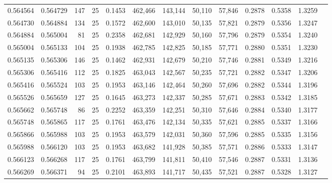 \begin{tabular}{rrrrrrrrrrrrr}
0.564564 & 0.564729 &   147 &  25 &                                     0.1453 & 462,466 & 143,144 &  50,110 &  57,846 & 0.2878 & 0.5358 & 1.3259 \\
0.564730 & 0.564884 &   134 &  25 &                                     0.1572 & 462,600 & 143,010 &  50,135 &  57,821 & 0.2879 & 0.5356 & 1.3247 \\
0.564884 & 0.565004 &    81 &  25 &                                     0.2358 & 462,681 & 142,929 &  50,160 &  57,796 & 0.2879 & 0.5354 & 1.3240 \\
0.565004 & 0.565133 &   104 &  25 &                                     0.1938 & 462,785 & 142,825 &  50,185 &  57,771 & 0.2880 & 0.5351 & 1.3230 \\
0.565135 & 0.565306 &   146 &  25 &                                     0.1462 & 462,931 & 142,679 &  50,210 &  57,746 & 0.2881 & 0.5349 & 1.3216 \\
0.565306 & 0.565416 &   112 &  25 &                                     0.1825 & 463,043 & 142,567 &  50,235 &  57,721 & 0.2882 & 0.5347 & 1.3206 \\
0.565416 & 0.565524 &   103 &  25 &                                     0.1953 & 463,146 & 142,464 &  50,260 &  57,696 & 0.2882 & 0.5344 & 1.3196 \\
0.565526 & 0.565659 &   127 &  25 &                                     0.1645 & 463,273 & 142,337 &  50,285 &  57,671 & 0.2883 & 0.5342 & 1.3185 \\
0.565662 & 0.565748 &    86 &  25 &                                     0.2252 & 463,359 & 142,251 &  50,310 &  57,646 & 0.2884 & 0.5340 & 1.3177 \\
0.565748 & 0.565865 &   117 &  25 &                                     0.1761 & 463,476 & 142,134 &  50,335 &  57,621 & 0.2885 & 0.5337 & 1.3166 \\
0.565866 & 0.565988 &   103 &  25 &                                     0.1953 & 463,579 & 142,031 &  50,360 &  57,596 & 0.2885 & 0.5335 & 1.3156 \\
0.565988 & 0.566120 &   103 &  25 &                                     0.1953 & 463,682 & 141,928 &  50,385 &  57,571 & 0.2886 & 0.5333 & 1.3147 \\
0.566123 & 0.566268 &   117 &  25 &                                     0.1761 & 463,799 & 141,811 &  50,410 &  57,546 & 0.2887 & 0.5331 & 1.3136 \\
0.566269 & 0.566371 &    94 &  25 &                                     0.2101 & 463,893 & 141,717 &  50,435 &  57,521 & 0.2887 & 0.5328 & 1.3127 \\

\end{tabular}
